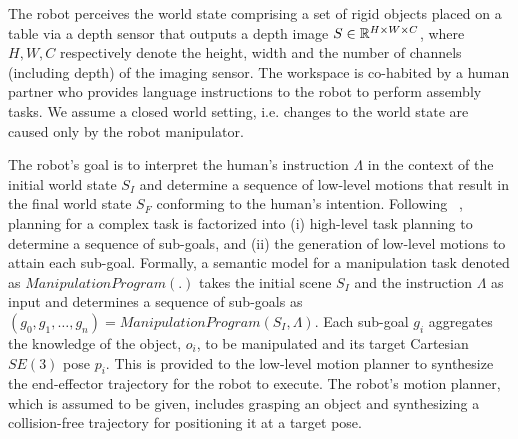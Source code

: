 \label{sec:problem}
The robot perceives the world state comprising a set of rigid objects placed on a table via a depth sensor that outputs a depth image $S \in \mathbb{R}^{H\times W \times C}$, where $H,W,C$ respectively
denote the height, width and the number of channels (including depth) of the imaging sensor.  
%
%
%
The workspace is co-habited by a human partner 
who provides language instructions 
%
to the robot to perform assembly tasks.
We assume a closed world setting, i.e. changes to the world state are caused only by the robot manipulator. 

The robot's goal is to interpret the human's instruction $\Lambda$ 
in the context of the initial world state $S_I$ and determine a 
sequence of low-level  motions that result in the final world state 
$S_F$ conforming to the human's intention.  
%
%
Following ~\cite{kaelbling2010hierarchical, zhu2020hierarchical}, 
planning for a complex task is factorized into  (i) high-level task planning to determine a sequence of sub-goals, and (ii) the generation of 
low-level motions to attain each sub-goal. 
%
Formally, a semantic model for a manipulation task denoted as $ManipulationProgram(.)$ takes the initial scene $S_I$ and the instruction $\Lambda$ as input and determines a sequence of 
sub-goals as $(g_0, g_1, \dots, g_n) = ManipulationProgram(S_I, \Lambda)$. 
%
Each sub-goal $g_i$ aggregates the 
knowledge of the object, $o_i$, to be manipulated 
and its target Cartesian $SE(3)$ pose $p_i$. This is  
provided to the low-level motion planner 
to synthesize the end-effector trajectory for the robot to execute. 
%
The robot's motion planner, which is assumed to be given, includes grasping an object  
and synthesizing a collision-free trajectory for positioning it at a target pose. 
%
%


